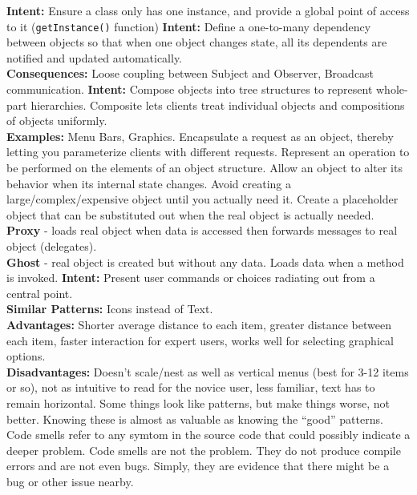 \documentclass[number]{assignment}
\begin{document}
\begin{landscape}
\begin{multicols}{3}
\textbf{Intent:} Ensure a class only has one instance, and provide a global point of access to it (\texttt{getInstance()} function)
\textbf{Intent:} Define a one-to-many dependency between objects so that when one object changes state, all its dependents are notified and updated automatically.\\
\textbf{Consequences:} Loose coupling between Subject and Observer, Broadcast communication.
\textbf{Intent:} Compose objects into tree structures to represent whole-part hierarchies. Composite lets clients treat individual objects and compositions of objects uniformly.\\
\textbf{Examples:} Menu Bars, Graphics.
Encapsulate a request as an object, thereby letting you parameterize clients with different requests.
Represent an operation to be performed on the elements of an object structure.
Allow an object to alter its behavior when its internal state changes.
Avoid creating a large/complex/expensive object until you actually need it. Create a placeholder object that can be substituted out when the real object is actually needed.\\
\textbf{Proxy} - loads real object when data is accessed then forwards messages to real object (delegates).\\
\textbf{Ghost} - real object is created but without any data. Loads data when a method is invoked.
\textbf{Intent:} Present user commands or choices radiating out from a central point.\\
\textbf{Similar Patterns:} Icons instead of Text.\\
\textbf{Advantages:} Shorter average distance to each item, greater distance between each item, faster interaction for expert users, works well for selecting graphical options.\\
\textbf{Disadvantages:} Doesn't scale/nest as well as vertical menus (best for 3-12 items or so), not as intuitive to read for the novice user, less familiar, text has to remain horizontal.
Some things look like patterns, but make things worse, not better. Knowing these is almost as valuable as knowing the ``good'' patterns.
Code smells refer to any symtom in the source code that could possibly indicate a deeper problem. Code smells are not the problem. They do not produce compile errors and are not even bugs. Simply, they are evidence that there might be a bug or other issue nearby.

\end{multicols}
\end{landscape}
\end{document}
